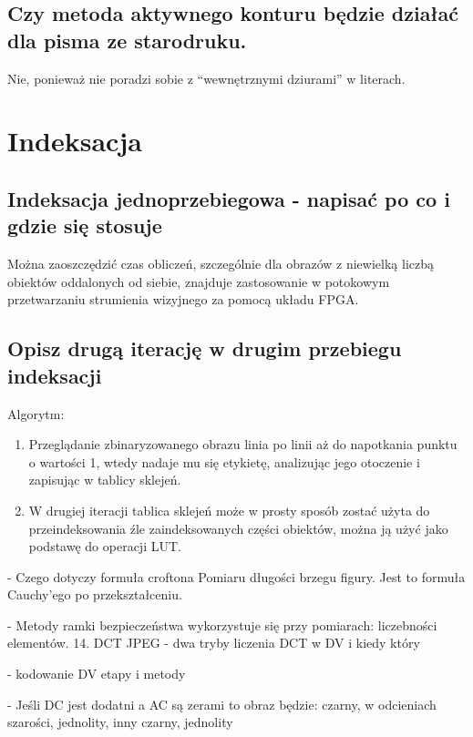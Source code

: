 \documentclass[a4paper, 12pt, titlepage]{article}
\begin{document}
\subsection{Czy metoda aktywnego konturu będzie działać dla pisma ze starodruku.}
Nie, ponieważ nie poradzi sobie z “wewnętrznymi dziurami” w literach.
\pagebreak\section{Indeksacja}

\subsection{Indeksacja jednoprzebiegowa - napisać po co i gdzie się stosuje}
Można zaoszczędzić czas obliczeń, szczególnie dla obrazów z niewielką liczbą obiektów oddalonych od siebie, znajduje zastosowanie w potokowym przetwarzaniu strumienia wizyjnego za pomocą układu FPGA.

\subsection{Opisz drugą iterację w drugim przebiegu indeksacji}
Algorytm:
\begin{enumerate}[noitemsep]
	\item Przeglądanie zbinaryzowanego obrazu linia po linii aż do napotkania punktu o wartości 1, wtedy nadaje mu się etykietę, analizując jego otoczenie i zapisując w tablicy sklejeń. 
	\item W drugiej iteracji tablica sklejeń może w prosty sposób zostać użyta do przeindeksowania źle zaindeksowanych części obiektów, można ją użyć jako podstawę do operacji LUT.
\end{enumerate}

- Czego dotyczy formuła croftona
Pomiaru długości brzegu figury. Jest to formuła Cauchy’ego po przekształceniu.

- Metody ramki bezpieczeństwa wykorzystuje się przy pomiarach: liczebności elementów.
14. DCT JPEG
- dwa tryby liczenia DCT w DV i kiedy który


- kodowanie DV etapy i metody


- Jeśli DC jest dodatni a AC są zerami to obraz będzie: czarny, w odcieniach szarości, jednolity, inny
czarny, jednolity
\end{document}
